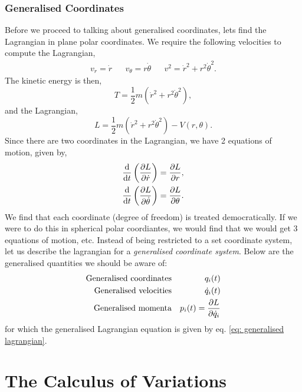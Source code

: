 \documentclass{book}
\begin{document}
\subsection{Generalised Coordinates}
Before we proceed to talking about generalised coordinates, lets find the Lagrangian in plane polar coordinates. We require the following velocities to compute the Lagrangian,
\begin{align}
	v_r = \Dot{r} && v_{\theta} = r\Dot{\theta} && v^2 = \Dot{r}^2 + r^2\Dot{\theta}^2.
\end{align}
The kinetic energy is then,
\begin{equation}
	T = \frac{1}{2}m(\Dot{r}^2 + r^2\Dot{\theta}^2),
\end{equation}
and the Lagrangian,
\begin{equation}
	L = \frac{1}{2}m(\Dot{r}^2 + r^2\Dot{\theta}^2) - V(r, \theta).
\end{equation}
Since there are two coordinates in the Lagrangian, we have 2 equations of motion, given by,
\begin{align}
	\dv{t}\left(\pdv{L}{\Dot{r}}\right) &= \pdv{L}{r}, \\
	\dv{t}\left(\pdv{L}{\Dot{\theta}}\right) &= \pdv{L}{\theta}.
\end{align}
We find that each coordinate (degree of freedom) is treated democratically. If we were to do this in spherical polar coordiantes, we would find that we would get 3 equations of motion, etc. Instead of being restricted to a set coordinate system, let us describe the lagrangian for a \textit{generalised coordinate system}. Below are the generalised quantities we should be aware of:
\begin{align}
	\text{Generalised coordinates} && q_i(t) \\
	\text{Generalised velocities} && \Dot{q}_i(t) \\
	\text{Generalised momenta} && p_i(t) = \pdv{L}{\Dot{q}_i}
\end{align}
for which the generalised Lagrangian equation is given by eq. \eqref{eq: generalised lagrangian}.
\chapter{The Calculus of Variations}
\end{document}
